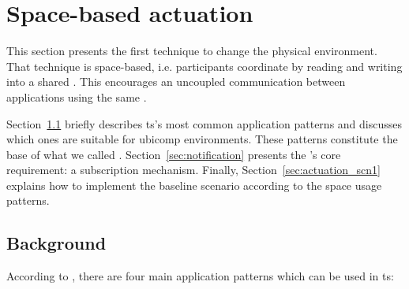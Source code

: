 \section{Space-based actuation}
\label{sec:actuation_space}


This section presents the first technique to change the physical environment.
That technique is space-based, i.e. participants coordinate by reading and writing into a shared \Space{}. %
This encourages an uncoupled communication between applications using the same \Space{}.

Section~\ref{sec:ts_patterns} briefly describes \acl{ts}'s most common application patterns and discusses which ones are suitable for \ac{ubicomp} environments. %
These patterns constitute the base of what we called \spaceActuation{}.
Section~\ref{sec:notification} presents the \spaceActuation{}'s core requirement: a subscription mechanism.
Finally, Section~\ref{sec:actuation_scn1} explains how to implement the baseline scenario according to the space usage patterns. %


\subsection{Background}
\label{sec:ts_patterns}

According to \citet{freeman_javaspaces_1999}, there are four main application patterns which can be used in \ac{ts}:


